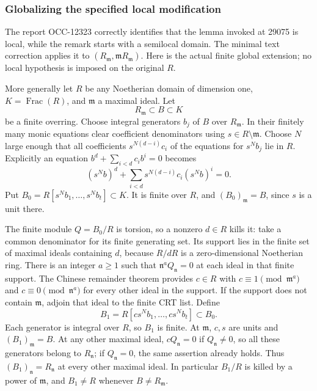 \subsubsection{Globalizing the specified local modification}\label{algebra-proof-028-globalizing-the-specified-local-modification}

The report OCC-12323 correctly identifies that the lemma invoked at 29075 is local, while the remark starts with a semilocal domain. The minimal text correction applies it to \((R_{\mathfrak m},\mathfrak mR_{\mathfrak m})\). Here is the actual finite global extension; no local hypothesis is imposed on the original \(R\).

More generally let \(R\) be any Noetherian domain of dimension one, \(K=\operatorname{Frac}(R)\), and \(\mathfrak m\) a maximal ideal. Let \[
 R_{\mathfrak m}\subset B\subset K
\] be a finite overring. Choose integral generators \(b_j\) of \(B\) over \(R_{\mathfrak m}\). In their finitely many monic equations clear coefficient denominators using \(s\in R\setminus\mathfrak m\). Choose \(N\) large enough that all coefficients \(s^{N(d-i)}c_i\) of the equations for \(s^Nb_j\) lie in \(R\). Explicitly an equation \(b^d+\sum_{i<d}c_i b^i=0\) becomes \[
 (s^Nb)^d+\sum_{i<d}s^{N(d-i)}c_i(s^Nb)^i=0.
\] Put \(B_0=R[s^Nb_1,\ldots,s^Nb_t]\subset K\). It is finite over \(R\), and \((B_0)_{\mathfrak m}=B\), since \(s\) is a unit there.

The finite module \(Q=B_0/R\) is torsion, so a nonzero \(d\in R\) kills it: take a common denominator for its finite generating set. Its support lies in the finite set of maximal ideals containing \(d\), because \(R/dR\) is a zero-dimensional Noetherian ring. There is an integer \(a\ge1\) such that \(\mathfrak n^a Q_{\mathfrak n}=0\) at each ideal in that finite support. The Chinese remainder theorem provides \(c\in R\) with \(c\equiv1\pmod{\mathfrak m^a}\) and \(c\equiv0\pmod{\mathfrak n^a}\) for every other ideal in the support. If the support does not contain \(\mathfrak m\), adjoin that ideal to the finite CRT list. Define \[
 B_1=R[c s^Nb_1,\ldots,c s^Nb_t]\subset B_0.
\] Each generator is integral over \(R\), so \(B_1\) is finite. At \(\mathfrak m\), \(c,s\) are units and \((B_1)_{\mathfrak m}=B\). At any other maximal ideal, \(cQ_{\mathfrak n}=0\) if \(Q_{\mathfrak n}\ne0\), so all these generators belong to \(R_{\mathfrak n}\); if \(Q_{\mathfrak n}=0\), the same assertion already holds. Thus \((B_1)_{\mathfrak n}=R_{\mathfrak n}\) at every other maximal ideal. In particular \(B_1/R\) is killed by a power of \(\mathfrak m\), and \(B_1\ne R\) whenever \(B\ne R_{\mathfrak m}\).

